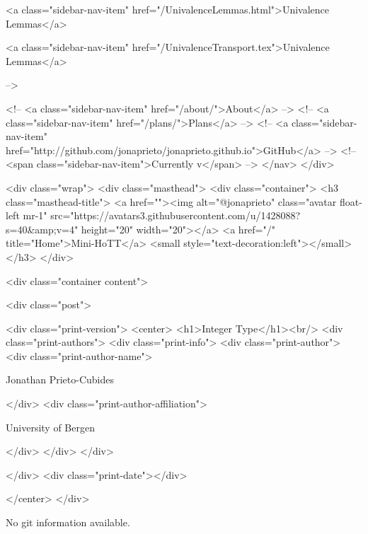       
    
      
        
          <a class="sidebar-nav-item" href="/UnivalenceLemmas.html">Univalence Lemmas</a>
        
      
    
      
        
          <a class="sidebar-nav-item" href="/UnivalenceTransport.tex">Univalence Lemmas</a>
        
      
     -->

    <!-- <a class="sidebar-nav-item" href="/about/">About</a> -->
    <!-- <a class="sidebar-nav-item" href="/plans/">Plans</a> -->
    <!-- <a class="sidebar-nav-item" href="http://github.com/jonaprieto/jonaprieto.github.io">GitHub</a> -->
    <!-- <span class="sidebar-nav-item">Currently v</span> -->
  </nav>
</div>

    <div class="wrap">
      <div class="masthead">
        <div class="container">
          <h3 class="masthead-title">
            <a href=""><img alt="@jonaprieto" class="avatar float-left mr-1" src="https://avatars3.githubusercontent.com/u/1428088?s=40&amp;v=4" height="20" width="20"></a>
            <a href="/" title="Home">Mini-HoTT</a>
            <small style="text-decoration:left"></small>
          </h3>
        </div>
      
      <div class="container content">
        







<div class="post">

  <div class="print-version">
    <center>
      <h1>Integer Type</h1><br/>
        <div class="print-authors">
          <div class="print-info">
            <div class="print-author">
              <div class="print-author-name">
                
                  Jonathan Prieto-Cubides
                
              </div>
              <div class="print-author-affiliation">
                
                  University of Bergen
                
                </div>
            </div>
          </div>
          
          
        </div>
        <div class="print-date"></div>
        
        
    </center>
  </div>

  
  No git information available.
  
